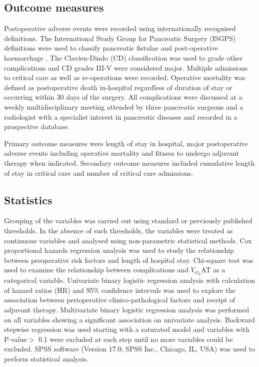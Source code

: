 \subsection{Outcome measures}
Postoperative adverse events were recorded using internationally recognised definitions. 
The International Study Group for Pancreatic Surgery (ISGPS) definitions were used to classify pancreatic fistulae \parencite{bassi_postoperative_2005} and post-operative haemorrhage \parencite{wente_postpancreatectomy_2007}. 
The Clavien-Dindo (CD) classification \parencite{clavien_clavien-dindo_2009, dindo_classification_2004} was used to grade other complications and CD grades III-V were considered major. 
Multiple admissions to critical care as well as re-operations were recorded. 
Operative mortality was defined as postoperative death in-hospital regardless of duration of stay or occurring within 30 days of the surgery. 
All complications were discussed at a weekly multidisciplinary meeting attended by three pancreatic surgeons and a radiologist with a specialist interest in pancreatic diseases and recorded in a prospective database.

Primary outcome measures were length of stay in hospital, major postoperative adverse events including operative mortality and fitness to undergo adjuvant therapy when indicated. 
Secondary outcome measures included cumulative length of stay in critical care and number of critical care admissions.

\subsection{Statistics}
Grouping of the variables was carried out using standard or previously published thresholds. 
In the absence of such thresholds, the variables were treated as continuous variables and analysed using non-parametric statistical methods. 
Cox proportional hazards regression analysis was used to study the relationship between preoperative risk factors and length of hospital stay. 
Chi-square test was used to examine the relationship between complications and $\dot{V}_{O_2}$AT as a categorical variable. 
Univariate binary logistic regression analysis with calculation of hazard ratios (HR) and 95\% confidence intervals was used to explore the association between perioperative clinico-pathological factors and receipt of adjuvant therapy. 
Multivariate binary logistic regression analysis was performed on all variables showing a significant association on univariate analysis. 
Backward stepwise regression was used starting with a saturated model and variables with P-value$>$  0.1 were excluded at each step until no more variables could be excluded. 
SPSS software (Version 17.0; SPSS Inc., Chicago, IL, USA) was used to perform statistical analysis.

